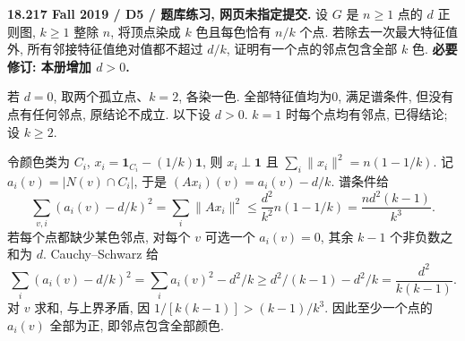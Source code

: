 \begin{exercise}\label{mit:18217-d5}
\textbf{18.217 Fall 2019 / D5 / 题库练习, 网页未指定提交.}
设 $G$ 是 $n\ge1$ 点的 $d$ 正则图, $k\ge1$ 整除 $n$, 将顶点染成 $k$ 色且每色恰有 $n/k$ 个点. 若除去一次最大特征值外, 所有邻接特征值绝对值都不超过 $d/k$, 证明有一个点的邻点包含全部 $k$ 色. \textbf{必要修订: 本册增加 $d>0$.}
\end{exercise}
\begin{solution}
若 $d=0$, 取两个孤立点、$k=2$, 各染一色. 全部特征值均为0, 满足谱条件, 但没有点有任何邻点, 原结论不成立. 以下设 $d>0$. $k=1$ 时每个点均有邻点, 已得结论; 设 $k\ge2$.

令颜色类为 $C_i$, $x_i=\mathbf1_{C_i}-(1/k)\mathbf1$, 则 $x_i\perp\mathbf1$ 且
$\sum_i\|x_i\|^2=n(1-1/k)$. 记 $a_i(v)=|N(v)\cap C_i|$, 于是 $(Ax_i)(v)=a_i(v)-d/k$. 谱条件给
\[
\sum_{v,i}(a_i(v)-d/k)^2
=\sum_i\|Ax_i\|^2
\le\frac{d^2}{k^2}n(1-1/k)
=\frac{nd^2(k-1)}{k^3}.
\]
若每个点都缺少某色邻点, 对每个 $v$ 可选一个 $a_i(v)=0$, 其余 $k-1$ 个非负数之和为 $d$. Cauchy--Schwarz 给
\[
\sum_i(a_i(v)-d/k)^2
=\sum_i a_i(v)^2-d^2/k
\ge d^2/(k-1)-d^2/k
=\frac{d^2}{k(k-1)}.
\]
对 $v$ 求和, 与上界矛盾, 因
$1/[k(k-1)]>(k-1)/k^3$. 因此至少一个点的 $a_i(v)$ 全部为正, 即邻点包含全部颜色.
\end{solution}

